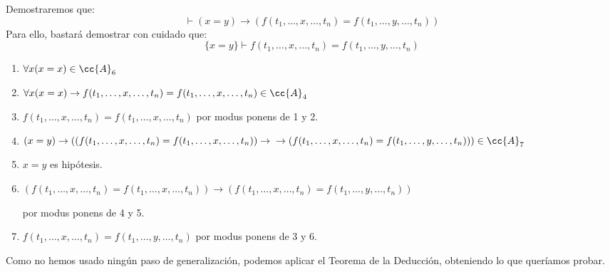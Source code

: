 \begin{ejemplo}
    Demostraremos que:
    \begin{equation*}
        \vdash (x=y) \to (f(t_1,\ldots,x,\ldots,t_n) = f(t_1,\ldots,y,\ldots,t_n))
    \end{equation*}
    Para ello, bastará demostrar con cuidado que:
    \begin{equation*}
        \{x=y\} \vdash f(t_1,\ldots,x,\ldots,t_n) = f(t_1,\ldots,y,\ldots,t_n)
    \end{equation*}
    \begin{enumerate}
        \item $\forall x(x=x)\in \cc{A}_6$ 
        \item $\forall x(x=x)\to f(t_1,\dots,x,\dots,t_n)=f(t_1,\dots,x,\dots,t_n)\in \cc{A}_4$
        \item $f(t_1,\dots,x,\dots,t_n)=f(t_1,\dots,x,\dots,t_n)$ por modus ponens de 1 y 2.
        \item $(x=y)\to ((f(t_1,\dots,x,\dots,t_n)=f(t_1,\dots,x,\dots,t_n))\to \\ \to (f(t_1,\dots,x,\dots,t_n)=f(t_1,\dots,y,\dots,t_n))) \in \cc{A}_7$
        \item $x=y$ es hipótesis.
        \item $(f(t_1,\ldots,x,\ldots,t_n)=f(t_1,\ldots,x,\ldots,t_n))\to (f(t_1,\ldots,x,\ldots,t_n)=f(t_1,\ldots,y,\ldots,t_n))$ 

            por modus ponens de 4 y 5.
        \item $f(t_1,\ldots,x,\ldots,t_n)=f(t_1,\ldots,y,\ldots,t_n)$ por modus ponens de 3 y 6.
    \end{enumerate}
    Como no hemos usado ningún paso de generalización, podemos aplicar el Teorema de la Deducción, obteniendo lo que queríamos probar.
\end{ejemplo}
